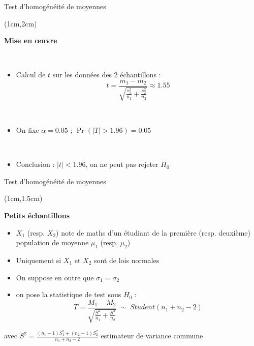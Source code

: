 \documentclass{beamer}
\begin{document}
\begin{frame}{Test d'homogénéité de moyennes}
\begin{textblock*}{\textwidth}(1cm,2cm)

\begin{center}{\bf \Large Mise en œuvre} \end{center}

\
\begin{itemize}
\item Calcul de $t$ sur les données des 2 échantillons :
$$t= \frac{m_1-m_2}{\sqrt{\frac{s_1^2}{n_1}+\frac{s_2^2}{n_2}} } \approx 1.55 $$

\
\item On fixe $\alpha=0.05$ ; $\Pr(|T|>1.96)=0.05$

\
\item Conclusion :  $|t|<1.96$, on ne peut pas rejeter $H_0$
\end{itemize}

\end{textblock*}
\end{frame}


\begin{frame}{Test d'homogénéité de moyennes}
\begin{textblock*}{\textwidth}(1cm,1.5cm)

\begin{center}{\bf \Large Petits échantillons } \end{center}

\vspace{0.2cm}

\begin{itemize}
\item $X_1$ (resp. $X_2$) note de maths d'un étudiant de la première (resp. deuxième) population de moyenne $\mu_1$ (resp. $\mu_2$)
\item Uniquement si $X_1$ et $X_2$ sont de lois normales
\item On suppose en outre que $\sigma_1=\sigma_2$
\item on pose la statistique de test sous $H_0$ : 
$$T=\frac{M_1-M_2}{\sqrt{\frac{S^2}{n_1}+\frac{S^2}{n_2}} } \; \sim \; Student(n_1+n_2-2)$$ 
\end{itemize}
avec $\displaystyle S^2=\frac{(n_1-1)S_1^2+(n_2-1)S_2^2}{n_1 + n_2-2} $ estimateur de variance commune
\end{textblock*}
\end{frame}
\end{document}
